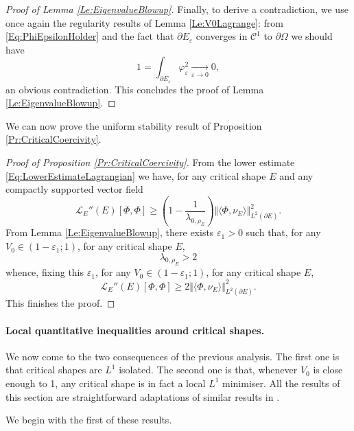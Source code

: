 \documentclass{article}
\renewcommand{\geq}{\geqslant}
\def\e{{\varepsilon}}
\def\O{{\Omega}}
\def\p{{\varphi}}
\numberwithin{equation}{section}
\begin{document}
\begin{proof}[Proof of Lemma \ref{Le:EigenvalueBlowup}]
Finally, to derive a contradiction, we use once again the regularity results of Lemma \ref{Le:V0Lagrange}: from \eqref{Eq:PhiEpsilonHolder} and the fact that $\partial E_\e$ converges in $\mathscr C^1$ to $\partial \O$ we should have 
\begin{equation}
1=\int_{\partial E_\e} \p_\e^2\underset{\e \to 0}\rightarrow 0,
\end{equation}
an obvious contradiction. This concludes the proof of Lemma \ref{Le:EigenvalueBlowup}.
\end{proof}

We can now prove the uniform stability result of Proposition \ref{Pr:CriticalCoercivity}.
\begin{proof}[Proof of Proposition \ref{Pr:CriticalCoercivity}]
From the lower estimate \eqref{Eq:LowerEstimateLagrangian} we have, for any critical shape $E$ and any compactly supported vector field 
\[ \mathscr L_E''(E)[\Phi,\Phi]\geq \left(1-\frac{1}{\lambda_{0,\rho_E}}\right)\Vert \langle \Phi,\nu_E\rangle\Vert_{L^2(\partial E)}^2.\] From Lemma \ref{Le:EigenvalueBlowup}, there exists $\e_1>0$ such that, for any $V_0\in(1-\e_1;1)$,  for any critical shape $E$, 
\[ \lambda_{0,\rho_E}>2\] whence, fixing this $\e_1$, for any $V_0\in (1-\e_1;1)$, for any critical shape $E$, 
\[ \mathscr L_E''(E)[\Phi,\Phi]\geq 2\Vert \langle \Phi,\nu_E\rangle\Vert_{L^2(\partial E)}^2.\] This finishes the proof.
\end{proof}

\paragraph{Local quantitative inequalities around critical shapes.}
We now come to the two consequences of the previous analysis.  The first one is that critical shapes are $L^1$ isolated. The second one is that, whenever $V_0$ is close enough to 1, any critical shape is in fact a local $L^1$ minimiser. All the results of this section are straightforward adaptations of similar results in \cite{MRB2020}.


We begin with the first of these results.
\end{document}
